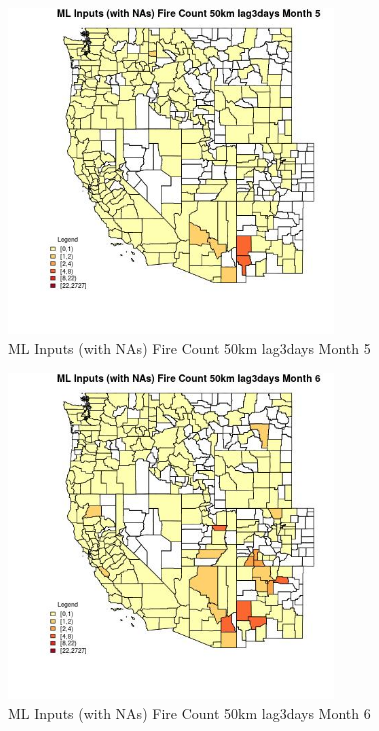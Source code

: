 \clearpage 

\begin{figure} 
\centering  
\includegraphics[width=0.77\textwidth]{Code_Outputs/Report_ML_input_PM25_Step4_part_f_de_duplicated_aveswNAs_CountyFire_Count_50km_lag3daysmedianMonth5.jpg} 
\caption{\label{fig:Report_ML_input_PM25_Step4_part_f_de_duplicated_aveswNAsCountyFire_Count_50km_lag3daysmedianMonth5}ML Inputs (with NAs) Fire Count 50km lag3days Month 5} 
\end{figure} 
 

\begin{figure} 
\centering  
\includegraphics[width=0.77\textwidth]{Code_Outputs/Report_ML_input_PM25_Step4_part_f_de_duplicated_aveswNAs_CountyFire_Count_50km_lag3daysmedianMonth6.jpg} 
\caption{\label{fig:Report_ML_input_PM25_Step4_part_f_de_duplicated_aveswNAsCountyFire_Count_50km_lag3daysmedianMonth6}ML Inputs (with NAs) Fire Count 50km lag3days Month 6} 
\end{figure} 
 

